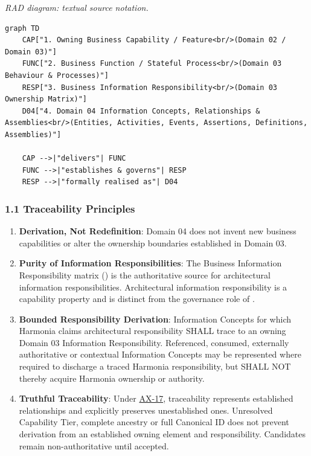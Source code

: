 \textit{RAD diagram: textual source notation.}
\begin{Verbatim}[breaklines,fontsize=\footnotesize]
graph TD
    CAP["1. Owning Business Capability / Feature<br/>(Domain 02 / Domain 03)"]
    FUNC["2. Business Function / Stateful Process<br/>(Domain 03 Behaviour & Processes)"]
    RESP["3. Business Information Responsibility<br/>(Domain 03 Ownership Matrix)"]
    D04["4. Domain 04 Information Concepts, Relationships & Assemblies<br/>(Entities, Activities, Events, Assertions, Definitions, Assemblies)"]

    CAP -->|"delivers"| FUNC
    FUNC -->|"establishes & governs"| RESP
    RESP -->|"formally realised as"| D04
\end{Verbatim}
\label{rad:traceability:33}
\subsubsection*{1.1 Traceability Principles}
\label{rad:traceability:34}

\begin{enumerate}

\item
\textbf{Derivation, Not Redefinition}: Domain 04 does not invent new business capabilities or alter the ownership boundaries established in Domain 03.



\item
\textbf{Purity of Information Responsibilities}: The Business Information Responsibility matrix (\texttt{}) is the authoritative source for architectural information responsibilities. Architectural information responsibility is a capability property and is distinct from the governance role of \texttt{}.



\item
\textbf{Bounded Responsibility Derivation}: Information Concepts for which Harmonia claims architectural responsibility SHALL trace to an owning Domain 03 Information Responsibility. Referenced, consumed, externally authoritative or contextual Information Concepts may be represented where required to discharge a traced Harmonia responsibility, but SHALL NOT thereby acquire Harmonia ownership or authority.



\item
\textbf{Truthful Traceability}: Under \href{https://github.com/fhirfactory/harmonia/blob/98410db60155198a75f74c79d98060070209faa1/docs/markdown/governance/architectural-axioms.md\#ax-17}{AX-17}, traceability represents established relationships and explicitly preserves unestablished ones. Unresolved Capability Tier, complete ancestry or full Canonical ID does not prevent derivation from an established owning element and responsibility. Candidates remain non-authoritative until accepted.



\end{enumerate}
\label{rad:traceability:39}

